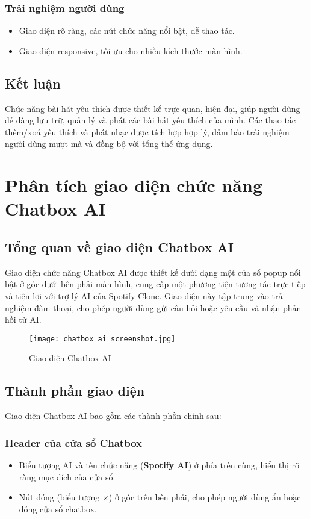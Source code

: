 \documentclass{book}
\let\oldsection\section
\renewcommand{\section}{\clearpage\oldsection}
\begin{document}
\subsubsection{Trải nghiệm người dùng}
\begin{itemize}
    \item Giao diện rõ ràng, các nút chức năng nổi bật, dễ thao tác.
    \item Giao diện responsive, tối ưu cho nhiều kích thước màn hình.
\end{itemize}

\subsection{Kết luận}
Chức năng bài hát yêu thích được thiết kế trực quan, hiện đại, giúp người dùng dễ dàng lưu trữ, quản lý và phát các bài hát yêu thích của mình. Các thao tác thêm/xoá yêu thích và phát nhạc được tích hợp hợp lý, đảm bảo trải nghiệm người dùng mượt mà và đồng bộ với tổng thể ứng dụng.

\section{Phân tích giao diện chức năng Chatbox AI}

\subsection{Tổng quan về giao diện Chatbox AI}
Giao diện chức năng Chatbox AI được thiết kế dưới dạng một cửa sổ popup nổi bật ở góc dưới bên phải màn hình, cung cấp một phương tiện tương tác trực tiếp và tiện lợi với trợ lý AI của Spotify Clone. Giao diện này tập trung vào trải nghiệm đàm thoại, cho phép người dùng gửi câu hỏi hoặc yêu cầu và nhận phản hồi từ AI.

\begin{figure}[h!]
\centering

 \texttt{[image: chatbox\_ai\_screenshot.jpg]} 
\caption{Giao diện Chatbox AI}
\label{fig:chatbox_ai}
\end{figure}

\subsection{Thành phần giao diện}
Giao diện Chatbox AI bao gồm các thành phần chính sau:

\subsubsection{Header của cửa sổ Chatbox}
\begin{itemize}
    \item Biểu tượng AI và tên chức năng (\textbf{Spotify AI}) ở phía trên cùng, hiển thị rõ ràng mục đích của cửa sổ.
    \item Nút đóng (biểu tượng \(\times\)) ở góc trên bên phải, cho phép người dùng ẩn hoặc đóng cửa sổ chatbox.
\end{itemize}
\end{document}
